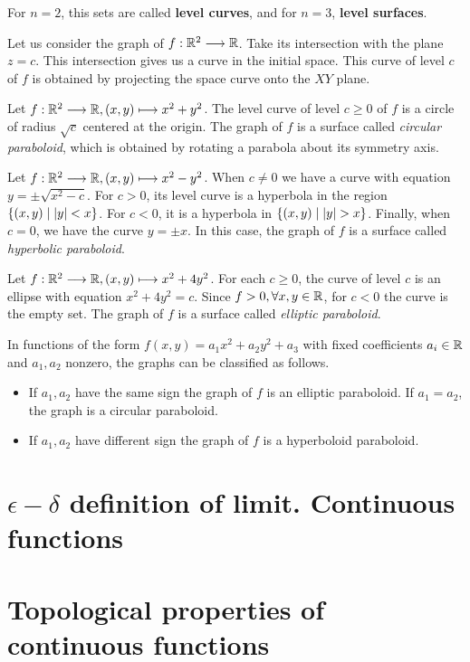 \begin{note}
    For $n=2$, this sets are called \textbf{level curves}, and for $n=3$, \textbf{level surfaces}.
\end{note}

Let us consider the graph of $\appl{f}{\R^2}{\R}$. Take its intersection with the plane $z = c$. This intersection gives 
us a curve in the initial space. This curve of level $c$ of $f$ is obtained by projecting the space curve onto the $XY$
plane.

\begin{example}
    Let $\appl{f}{\R^2}{\R}, (x, y)\longmapsto x^2 + y^2$. The level curve of level $c\geq 0$ of $f$ is a circle of radius
    $\sqrt{c}$ centered at the origin. The graph of $f$ is a surface called \textit{circular paraboloid}, which is obtained
    by rotating a parabola about its symmetry axis.
\end{example}

\begin{example}
    Let $\appl{f}{\R^2}{\R}, (x, y)\longmapsto x^2 - y^2$. When $c\neq 0$ we have a curve with equation $y = \pm\sqrt{x^2 - c}$.
    For $c > 0$, its level curve is a hyperbola in the region $\{(x, y)\; | \; \abs{y} < x\}$. For $c < 0$, it is a hyperbola in
    $\{(x, y)\; | \;\abs{y} > x\}$. Finally, when $c = 0$, we have the curve $y = \pm x$. In this case, the graph of $f$ is a 
    surface called \textit{hyperbolic paraboloid}.
\end{example}

\begin{example}
    Let $\appl{f}{\R^2}{\R}, (x, y)\longmapsto x^2 + 4y^2$. For each $c\geq 0$, the curve of level $c$ is an ellipse with
    equation $x^2 + 4y^2 = c$. Since $f > 0, \forall x, y\in\R$, for $c < 0$ the curve is the empty set. The graph of $f$ is
    a surface called \textit{elliptic paraboloid}.
\end{example}

\begin{remark}
    In functions of the form $f(x, y) = a_1x^2 + a_2y^2 + a_3$ with fixed coefficients $a_i\in\R$ and $a_1, a_2$ nonzero, the
    graphs can be classified as follows.
    \begin{itemize}[itemsep = -2pt]
        \item If $a_1, a_2$ have the same sign the graph of $f$ is an elliptic paraboloid. If $a_1 = a_2$, the graph is a 
            circular paraboloid.
        \item If $a_1, a_2$ have different sign the graph of $f$ is a hyperboloid paraboloid.
    \end{itemize}
\end{remark}

\section{$\epsilon-\delta$ definition of limit. Continuous functions}
\section{Topological properties of continuous functions}
